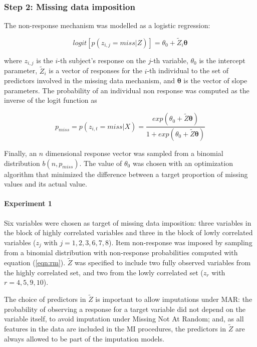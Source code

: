 \subsubsection{Step 2: Missing data imposition} \label{sub_missing}

	The non-response mechanism was modelled as a logistic regression:

	\begin{equation}
		logit[p(z_{i,j} = miss | Z)] = \theta_0 + \tilde{Z}_{i}\bm{\theta}
	\end{equation}
	
	where $z_{i,j}$ is the $i$-th subject's response on the $j$-th variable, $\theta_0$ is the intercept parameter,
	$\tilde{Z}_{i}$ is a vector of responses for the $i$-th individual to the set of predictors involved in the
	missing data mechanism, and $\bm{\theta}$ is the vector of slope parameters.
	The probability of an individual non response was computed as the inverse of the logit function as

	\begin{equation} \label{eqn:rm}
		p_{miss} = p(z_{i,t} = miss | X) = \frac{ exp(\theta_0 + \tilde{Z}\bm{\theta}) }
								{ 1 + exp(\theta_0 + \tilde{Z}\bm{\theta}) }
	\end{equation}

	Finally, an $n$ dimensional response vector was sampled from a binomial distribution $b(n, p_{miss})$.
	The value of $\theta_0$ was chosen with an optimization algorithm that minimized the difference between a 
	target proportion of missing values and its actual value.

	\paragraph{Experiment 1}
	Six variables were chosen as target of missing data imposition: three variables in the block of
	highly correlated variables and three in the block of lowly correlated variables ($z_j$ with $j = 1,2,3,6,7,8$).
	Item non-response was imposed by sampling from a binomial distribution with non-response probabilities computed 
	with equation (\ref{eqn:rm}). 
	$\tilde{Z}$ was specified to include two fully observed variables from the highly correlated set, and two 
	from the lowly correlated set ($z_r$ with $r = 4,5,9,10$).

	The choice of predictors in $\tilde{Z}$ is important to allow imputations under MAR: 
	the probability of observing a response for a target variable did not depend on the variable itself, 
	to avoid imputation under Missing Not At Random; and, as all features in the data are included in the MI 
	procedures, the predictors in $\tilde{Z}$ are always allowed to be part of the imputation models.

